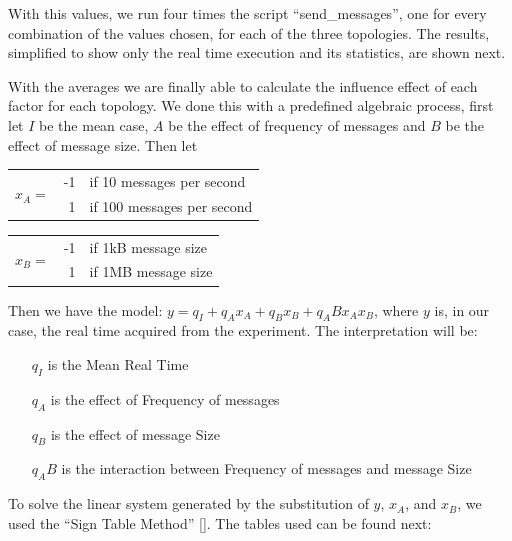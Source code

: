With this values, we run four times the script ``send_messages'', one for every combination of the values chosen, for each of the three topologies. The results, simplified to show only the real time execution and its statistics, are shown next.


	
With the averages we are finally able to calculate the influence effect of each factor for each topology. We done this with a predefined algebraic process, first let $I$ be the mean case, $A$ be the effect of frequency of messages and $B$ be the effect of message size. Then let

\begin{center}
	\begin{tabular}{c | r l}
		\multirow{2}{*}{$x _A = $} & -1 & if 10  messages per second \\
		                           &  1 & if 100 messages per second \\
	\end{tabular}
\end{center}

\begin{center}
	\begin{tabular}{c | r l}
		\multirow{2}{*}{$x _B = $} & -1 & if 1kB message size \\
		                           &  1 & if 1MB message size \\
	\end{tabular}
\end{center}

Then we have the model: $y = q _I + q _A x _A + q _B x _B + q _AB x _A x _B $, where $y$ is, in our case, the real time acquired from the experiment. The interpretation will be:
\begin{itemize}
	\item[$q _I$] is the Mean Real Time
	\item[$q _A$] is the effect of Frequency of messages
	\item[$q _B$] is the effect of message Size
	\item[$q _AB$] is the interaction between Frequency of messages and message Size
\end{itemize}

To solve the linear system generated by the substitution of $y$, $x _A$, and $x _B$, we used the ``Sign Table Method'' [\citet{2KFACTORIAL}]. The tables used can be found next:





